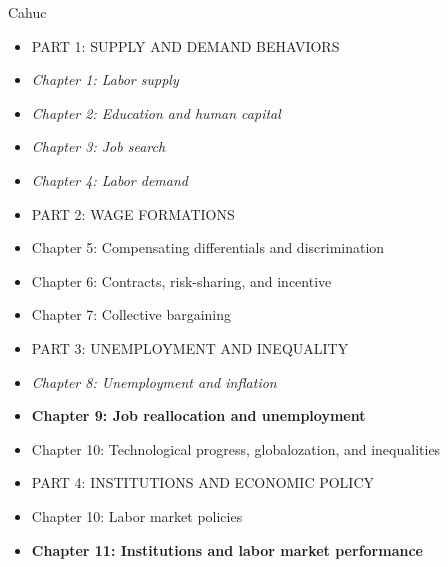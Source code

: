 Cahuc
% 
 \begin{itemize} [topsep=6pt,itemsep=-1ex]
   \item PART 1: SUPPLY AND DEMAND BEHAVIORS
   \item \textit{Chapter 1: Labor supply \parencite[1-58]{Cahuc2004}}
   \item \textit{Chapter 2: Education and human capital \parencite[59-108]{Cahuc2004}}
   \item \textit{Chapter 3: Job search \parencite[109-170]{Cahuc2004}}
   \item \textit{Chapter 4: Labor demand \parencite[171-242]{Cahuc2004}}
   \item PART 2: WAGE FORMATIONS
   \item Chapter 5: Compensating differentials and discrimination \parencite[243-304]{Cahuc2004}
   \item Chapter 6: Contracts, risk-sharing, and incentive \parencite[305-368]{Cahuc2004}
   \item Chapter 7: Collective bargaining \parencite[369-440]{Cahuc2004}
   \item PART 3: UNEMPLOYMENT AND INEQUALITY
   \item \textit{Chapter 8: Unemployment and inflation \parencite[441-502]{Cahuc2004}}
   \item \textbf{Chapter 9: Job reallocation and unemployment \parencite[503-562]{Cahuc2004}}
   \item Chapter 10: Technological progress, globalozation, and inequalities \parencite[563-632]{Cahuc2004}
   \item PART 4: INSTITUTIONS AND ECONOMIC POLICY
   \item Chapter 10: Labor market policies \parencite[633-712]{Cahuc2004}
   \item \textbf{Chapter 11: Institutions and labor market performance \parencite[713-810]{Cahuc2004}}
 \end{itemize}



